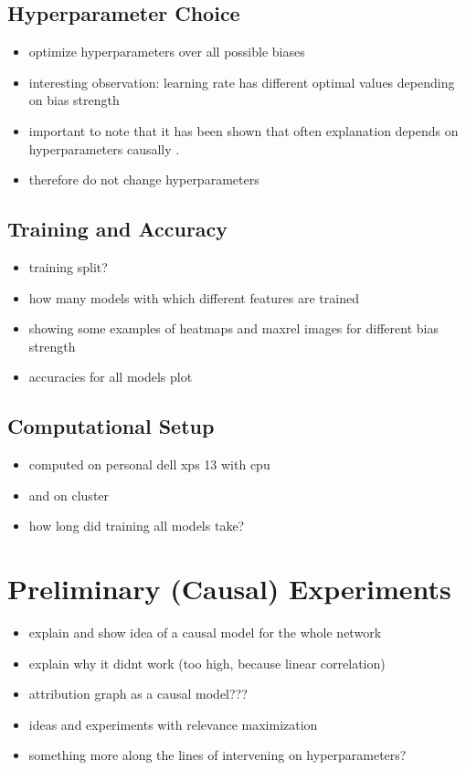 \subsection{Hyperparameter Choice}
\begin{itemize}
    \item optimize hyperparameters over all possible biases
    \item interesting observation: learning rate has different optimal values depending on bias strength
    \item important to note that it has been shown that often explanation depends on hyperparameters causally \cite{Karimi2023}.
    \item therefore do not change hyperparameters
\end{itemize}

\subsection{Training and Accuracy}
\begin{itemize}
    \item training split?
    \item how many models with which different features are trained
    \item showing some examples of heatmaps and maxrel images for different bias strength
    \item accuracies for all models plot
\end{itemize}

\subsection{Computational Setup}
\label{section:setup}
\begin{itemize}
    \item computed on personal dell xps 13 with cpu
    \item and on cluster 
    \item how long did training all models take?
\end{itemize}

\section{Preliminary (Causal) Experiments} 
\begin{itemize}
    \item explain and show idea of a causal model for the whole network
    \item explain why it didnt work (too high, because linear correlation)
    \item attribution graph as a causal model???
    \item ideas and experiments with relevance maximization
    \item something more along the lines of intervening on hyperparameters? \cite{Karimi2023}
\end{itemize}

